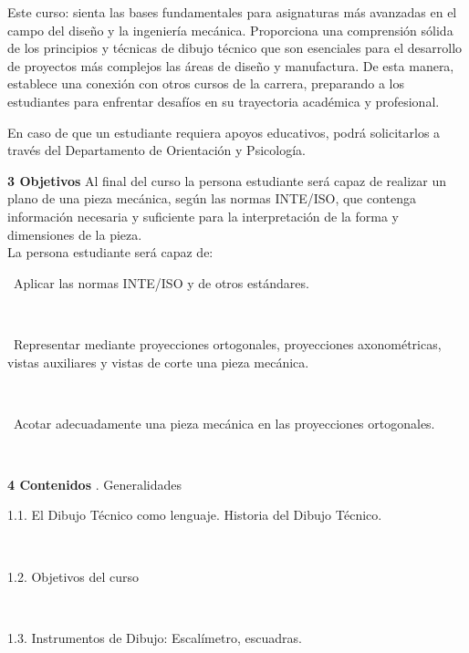 \documentclass[letterpaper]{article}%
\begin{document}
Este curso: sienta las bases fundamentales para asignaturas más avanzadas en el campo del diseño y la ingeniería mecánica. Proporciona una comprensión sólida de los principios y técnicas de dibujo técnico que son esenciales para el desarrollo de proyectos más complejos las áreas de diseño y manufactura. De esta manera, establece una conexión con otros cursos de la carrera, preparando a los estudiantes para enfrentar desafíos en su trayectoria académica y profesional.​

En caso de que un estudiante requiera apoyos educativos, podrá solicitarlos a través del Departamento de Orientación y Psicología.%
\par\fontsize{12}{20}\selectfont \textbf{\textcolor{parte}{3 Objetivos}}%
\newline%
Al final del curso la persona estudiante será capaz de realizar un plano de una pieza mecánica, según las normas INTE/ISO, que contenga información necesaria y suficiente para la interpretación de la forma y dimensiones de la pieza.\\
La persona estudiante será capaz de:\\
\hspace*{0.02\linewidth}\parbox{0.98\linewidth}{\strut\textbullet\, Aplicar las normas INTE/ISO y de otros estándares.
\strut}\\
\hspace*{0.02\linewidth}\parbox{0.98\linewidth}{\strut\textbullet\, Representar mediante proyecciones ortogonales, proyecciones axonométricas, vistas auxiliares y vistas de corte una pieza mecánica.
\strut}\\
\hspace*{0.02\linewidth}\parbox{0.98\linewidth}{\strut\textbullet\, Acotar adecuadamente una pieza mecánica en las proyecciones ortogonales.\strut}\\
%
\par\fontsize{12}{20}\selectfont \textbf{\textcolor{parte}{4 Contenidos}}%
. Generalidades\\
\hspace*{0.02\linewidth}\parbox{0.98\linewidth}{\strut 1.1. El Dibujo Técnico como lenguaje. Historia del Dibujo Técnico.\strut}\\
\hspace*{0.02\linewidth}\parbox{0.98\linewidth}{\strut 1.2. Objetivos del curso\strut}\\
\hspace*{0.02\linewidth}\parbox{0.98\linewidth}{\strut 1.3. Instrumentos de Dibujo: Escalímetro, escuadras.\strut}\\
\end{document}
